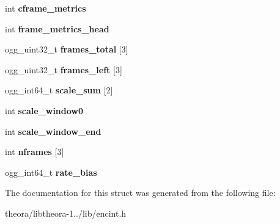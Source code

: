 \begin{DoxyCompactItemize}
\item 
\hypertarget{structoc__rc__state_a67c7ace28a1e81e4eef362411525955f}{int {\bfseries cframe\+\_\+metrics}}\label{structoc__rc__state_a67c7ace28a1e81e4eef362411525955f}

\item 
\hypertarget{structoc__rc__state_ab63ab5fe03e6279e353b08892602e883}{int {\bfseries frame\+\_\+metrics\+\_\+head}}\label{structoc__rc__state_ab63ab5fe03e6279e353b08892602e883}

\item 
\hypertarget{structoc__rc__state_adaabfae1d641e80a4379fd3096970ac5}{ogg\+\_\+uint32\+\_\+t {\bfseries frames\+\_\+total} \mbox{[}3\mbox{]}}\label{structoc__rc__state_adaabfae1d641e80a4379fd3096970ac5}

\item 
\hypertarget{structoc__rc__state_a05d4cc8df3001e8c25603b04b4306481}{ogg\+\_\+uint32\+\_\+t {\bfseries frames\+\_\+left} \mbox{[}3\mbox{]}}\label{structoc__rc__state_a05d4cc8df3001e8c25603b04b4306481}

\item 
\hypertarget{structoc__rc__state_ae0453f232d804a5f0be22060060fec46}{ogg\+\_\+int64\+\_\+t {\bfseries scale\+\_\+sum} \mbox{[}2\mbox{]}}\label{structoc__rc__state_ae0453f232d804a5f0be22060060fec46}

\item 
\hypertarget{structoc__rc__state_a76a0f20847d6b2a8af3f84f835b86c94}{int {\bfseries scale\+\_\+window0}}\label{structoc__rc__state_a76a0f20847d6b2a8af3f84f835b86c94}

\item 
\hypertarget{structoc__rc__state_ac744e50aed301afb49e3ab08f37377a7}{int {\bfseries scale\+\_\+window\+\_\+end}}\label{structoc__rc__state_ac744e50aed301afb49e3ab08f37377a7}

\item 
\hypertarget{structoc__rc__state_a14489aa0543498663d705fd724136776}{int {\bfseries nframes} \mbox{[}3\mbox{]}}\label{structoc__rc__state_a14489aa0543498663d705fd724136776}

\item 
\hypertarget{structoc__rc__state_a8f6be94feacfe97180383aa54e08db62}{ogg\+\_\+int64\+\_\+t {\bfseries rate\+\_\+bias}}\label{structoc__rc__state_a8f6be94feacfe97180383aa54e08db62}

\end{DoxyCompactItemize}


The documentation for this struct was generated from the following file\+:\begin{DoxyCompactItemize}
\item 
theora/libtheora-\/1../lib/encint.\+h\end{DoxyCompactItemize}
